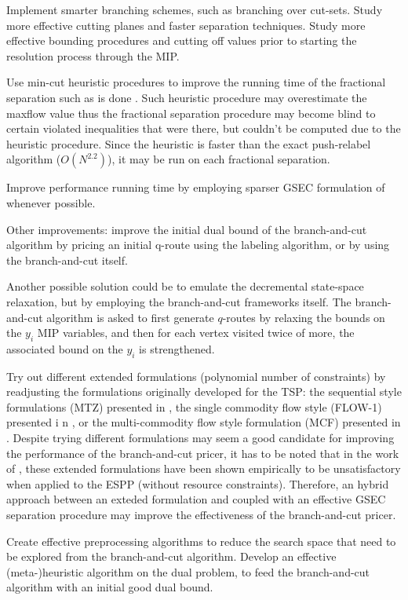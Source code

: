 Implement smarter branching schemes, such as branching over cut-sets.
Study more effective cutting planes and
faster separation techniques.
Study more effective bounding procedures and cutting off values
prior to starting the resolution process through the MIP.

Use min-cut heuristic procedures to improve
the running time of the fractional separation
such as is done \textcite{kernighan1970}.
Such heuristic procedure may overestimate the maxflow
value thus the fractional separation procedure may
become blind to certain violated inequalities that were
there, but couldn't be computed due to the heuristic procedure.
Since the heuristic is faster than the exact push-relabel
algorithm ($O(N^{2.2})$), it may be run on each fractional
separation.

Improve performance running time by employing
sparser GSEC formulation of 
whenever possible.

Other improvements: improve the initial dual bound of the branch-and-cut
algorithm by pricing an initial q-route using the labeling algorithm,
or by using the branch-and-cut itself.

Another possible solution could be to emulate the decremental state-space
relaxation, but by employing the branch-and-cut frameworks itself.
The branch-and-cut algorithm is asked to first generate $q$-routes by
relaxing the bounds on the $y_i$ MIP variables,
and then for each vertex visited twice of more, the associated bound
on the $y_i$ is strengthened.

Try out different extended formulations (polynomial number of constraints)
by readjusting the formulations originally developed for the TSP:
the sequential style formulations (MTZ) presented in \textcite{miller1960},
the single commodity flow style (FLOW-1) presented i n \textcite{gavish1978travelling},
or the multi-commodity flow style formulation (MCF) presented in \textcite{wong1980integer,claus1984new}.
Despite trying different formulations may seem a good candidate for improving
the performance of the branch-and-cut pricer,
it has to be noted that in the work of \textcite{taccari2016},
these extended formulations have been shown empirically
to be unsatisfactory when applied to the ESPP (without resource constraints).
Therefore, an hybrid approach between an exteded formulation
and coupled with an effective GSEC separation procedure may improve
the effectiveness of the branch-and-cut pricer.

Create effective preprocessing algorithms to reduce the search space
that need to be explored from the branch-and-cut algorithm.
Develop an effective (meta-)heuristic algorithm on the dual problem,
to feed the branch-and-cut algorithm with an initial good dual bound.

